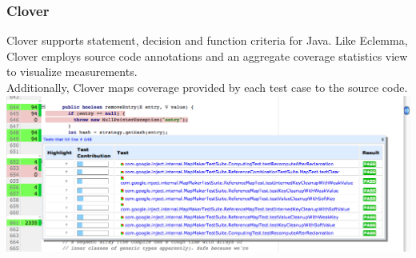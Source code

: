 \documentclass{beamer}
\begin{document}
\begin{frame}
  \frametitle{Clover}
Clover supports statement, decision and function criteria for Java.\newline
Like Eclemma, Clover employs source code annotations and an aggregate coverage statistics view to visualize measurements.\\
Additionally, Clover maps coverage provided by each test case to the source code.
  \includegraphics[width=\textwidth]{clover_mantain.png}
\end{frame}
\end{document}
